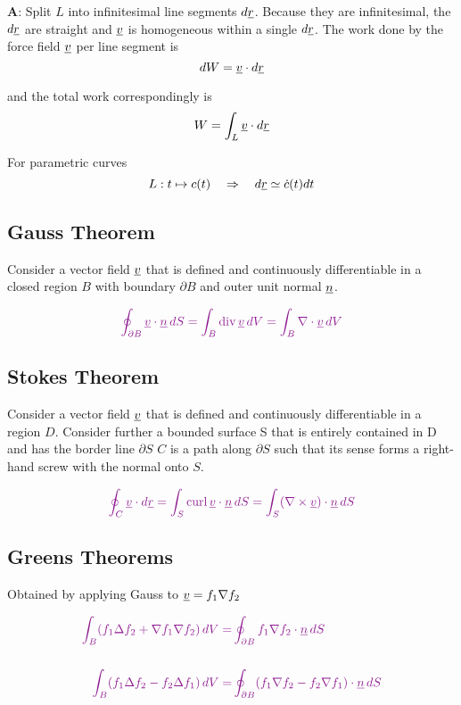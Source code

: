 \textbf{A}: Split $L$ into infinitesimal line segments $d\underline{r}$.
Because they are infinitesimal, the $d\underline{r}$ are straight and $\underline{v}$ is homogeneous within a single $d\underline{r}$.
The work done by the force field $\underline{v}$ per line segment is
\[
	dW = \underline{v} \cdot d\underline{r}
\]

and the total work correspondingly is
\[
	W = \int_L \underline{v} \cdot d\underline{r}
\]

For parametric curves
\[
	L: t \mapsto c(t) \quad \Rightarrow \quad d\underline{r} \simeq \dot{c}(t) dt
\]




\subsection*{Gauss Theorem}
Consider a vector field $\underline{v}$ that is defined and continuously differentiable in a closed region $B$ with boundary $\partial B$ and outer unit normal $\underline{n}$.

\[
	\color{Plum}
	\oint_{\partial B} \ul{v} \cdot \ul{n} \, dS  =  \int_{B} \div \ul{v}  \, dV =  \int_{B} \nabla \cdot \ul{v}  \, dV
\]



\subsection*{Stokes Theorem}
Consider a vector field $\underline{v}$ that is defined and continuously differentiable in a region $D$.
Consider further a bounded surface S that is entirely contained in D and has the border line $\partial S$
$C$ is a path along $\partial S$ such that its sense forms a right-hand screw with the normal onto $S$.

\[
	\color{Plum}
	\oint_{C} \ul{v} \cdot d\ul{r}  =  \int_{S} \curl \ul{v}  \cdot \ul{n} \, dS =  \int_{S} (\nabla \times \ul{v})  \cdot \ul{n} \, dS
\]



\subsection*{Greens Theorems}
Obtained by applying Gauss to $\underline{v} = f_1 \nabla f_2$

\[
\color{Plum}
\begin{aligned}
	\int_{B} (f_1 \Delta f_2  + \nabla f_1 \nabla f_2) \, dV = & \oint_{\partial B} f_1 \nabla f_2 \cdot \ul{n} \, dS \\
	\\
	\int_{B} (f_1 \Delta f_2  - f_2 \Delta f_1 ) \, dV = &\oint_{\partial B} (f_1 \nabla f_2 -  f_2 \nabla f_1) \cdot \ul{n} \,dS \\
\end{aligned}
\]



